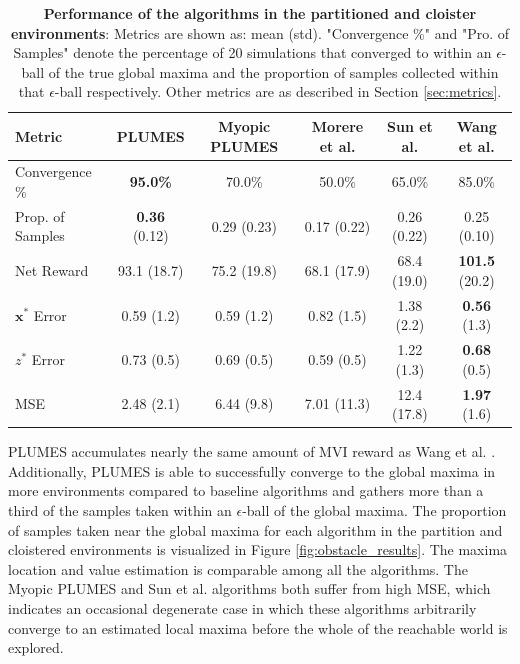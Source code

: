 \documentclass{styles/svproc}
\newcommand{\x}{\mathbf{x}}
\begin{document}
\begin{table}[b]
\caption{\textbf{Performance of the algorithms in the partitioned and cloister environments}: Metrics are shown as: mean (std). "Convergence \%" and "Pro. of Samples" denote the percentage of 20 simulations that  converged to within an $\epsilon$-ball of the true global maxima and the proportion of samples collected within that $\epsilon$-ball respectively. Other metrics are as described in Section \ref{sec:metrics}.}
\label{tab:obstacle_results}
\begin{tabular}{l | c | c | c | c | c }
Metric & PLUMES & Myopic PLUMES & Morere et al. \cite{Marchant2014a} & Sun et al. \cite{Sun2017} & Wang et al. \cite{wang2017max}\\ [2pt] 
\hline 
\hline
Convergence \% & \textbf{95.0\% } & 70.0\% & 50.0\% & 65.0\% & 85.0\% \\ Prop. of Samples  & \textbf{0.36} (0.12)  & 0.29 (0.23) & 0.17 (0.22) & 0.26 (0.22) & 0.25 (0.10) \\
Net Reward & 93.1 (18.7) & 75.2 (19.8) & 68.1 (17.9) & 68.4 (19.0) & \textbf{101.5} (20.2)\\
$\x^*$ Error & 0.59 (1.2) & 0.59 (1.2) & 0.82 (1.5) & 1.38 (2.2) & \textbf{0.56} (1.3) \\
$z^*$  Error & 0.73 (0.5) & 0.69 (0.5) & 0.59 (0.5) & 1.22 (1.3) & \textbf{0.68} (0.5) \\
MSE & 2.48 (2.1) & 6.44 (9.8) & 7.01 (11.3) & 12.4 (17.8) & \textbf{1.97} (1.6) \\
\hline
\end{tabular}
\end{table}

PLUMES accumulates nearly the same amount of MVI reward as Wang et al. \cite{wang2017max}. Additionally, PLUMES is able to successfully converge to the global maxima in more environments compared to baseline algorithms and gathers more than a third of the samples taken within an $\epsilon$-ball of the global maxima. The proportion of samples taken near the global maxima for each algorithm in the partition and cloistered environments is visualized in Figure \ref{fig:obstacle_results}.
The maxima location and value estimation is comparable among all the algorithms. The Myopic PLUMES and Sun et al. algorithms both suffer from high MSE, which indicates an occasional degenerate case in which these algorithms arbitrarily converge to an estimated local maxima before the whole of the reachable world is explored. 
\end{document}
